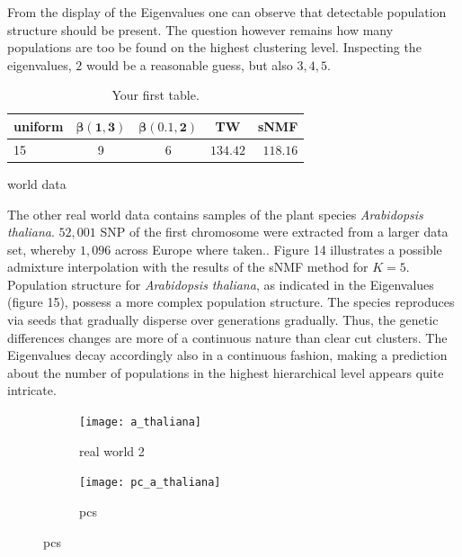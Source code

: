 \documentclass[a4paper, 11pt]{article}
\begin{document}
From the display of the Eigenvalues one can observe that detectable population structure should be present. The question however remains how many populations are too be found on the highest clustering level. Inspecting the eigenvalues, $2$ would be a reasonable guess, but also $3, 4, 5$.

\begin{table}[h!]
  \begin{center}
    \label{tab:table2}
    \begin{tabular}{l|c|c|c|r} %
      \textbf{uniform} & $\mathbf{\beta(1, 3)}$ & $\mathbf{\beta(0.1,2)}$ & \textbf{TW} & \textbf{sNMF}\\
      \hline
      15 & 9 & 6 & $134.42$ & $118.16$\\
    \end{tabular}
    \caption{Your first table.}
  \end{center}
\end{table}


world data \parencite{li2008worldwide}

The other real world data contains samples of the plant species \textit{Arabidopsis thaliana}. $52,001$ SNP of the first chromosome were extracted from a larger data set, whereby $1,096$ across Europe where taken.\parencite{franccois2016running}.
Figure 14 illustrates a possible admixture interpolation with the results of the sNMF method for $K = 5$. Population structure for \textit{Arabidopsis thaliana}, as indicated in the Eigenvalues (figure 15), possess a more complex population structure. The species reproduces via seeds that gradually disperse over generations gradually. Thus, the genetic differences changes are more of a continuous nature than clear cut clusters. The Eigenvalues decay accordingly also in a continuous fashion, making a prediction about the number of populations in the highest hierarchical level appears quite intricate.

\begin{figure}
\centering
\begin{subfigure}
\centering
\texttt{[image: a\_thaliana]}
\caption{real world 2}
\end{subfigure}
\begin{subfigure}
\centering
\texttt{[image: pc\_a\_thaliana]}
\caption{pcs}
\end{subfigure}
\end{figure}
\end{document}
